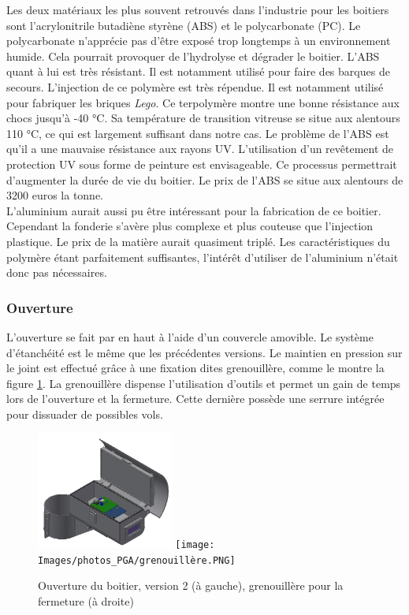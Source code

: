 Les deux matériaux les plus souvent retrouvés dans l’industrie pour les boitiers sont l’acrylonitrile 
butadiène styrène (ABS) et le polycarbonate (PC). Le polycarbonate n’apprécie pas d’être exposé trop 
longtemps à un environnement humide. Cela pourrait provoquer de l’hydrolyse et dégrader le boitier. 
L’ABS quant à lui est très résistant. Il est notamment utilisé pour faire des barques de secours.  
L’injection de ce polymère est très répendue. Il est notamment utilisé pour fabriquer les briques \emph{Lego}. 
Ce terpolymère montre une bonne résistance aux chocs jusqu'à -40 °C. Sa température de transition vitreuse se 
situe aux alentours 110 °C, ce qui est largement suffisant dans notre cas. Le problème de l’ABS est qu’il a une mauvaise 
résistance aux rayons UV. L’utilisation d’un revêtement de protection UV sous forme de peinture est envisageable. 
Ce processus permettrait d’augmenter la durée de vie du boitier. Le prix de l’ABS se situe aux alentours 
de 3200 euros la tonne\footnotemark[1].\\
L’aluminium aurait aussi pu être intéressant pour la fabrication de ce boitier. Cependant la fonderie 
s’avère plus complexe et plus couteuse que l’injection plastique. Le prix de la matière aurait quasiment 
triplé. Les caractéristiques du polymère étant parfaitement suffisantes, l’intérêt d’utiliser de l’aluminium 
n’était donc pas nécessaires.


\subsubsection{Ouverture}

L’ouverture se fait par en haut à l’aide d’un couvercle amovible. Le système d’étanchéité est le 
même que les précédentes versions. Le maintien en pression sur le joint est effectué grâce à 
une fixation dites grenouillère, comme le montre la figure \ref{fig:ouverturev2}. La grenouillère 
dispense l’utilisation d’outils et permet un gain de temps lors de l’ouverture et la fermeture. 
Cette dernière possède une serrure intégrée pour dissuader de possibles vols.

\begin{figure}[H]
    \centering
    \includegraphics[width=0.4\textwidth]{Images/photos_PGA/Boitierv41.PNG}
    \texttt{[image: Images/photos\_PGA/grenouillère.PNG]}
    \caption{Ouverture du boitier, version 2 (à gauche), grenouillère pour la fermeture (à droite)}
    \label{fig:ouverturev2}
\end{figure}

